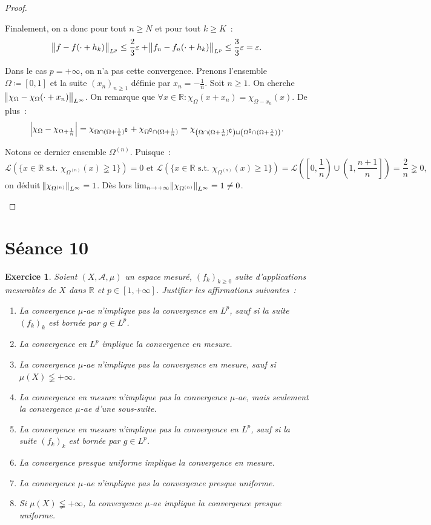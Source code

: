 \documentclass{article}
\newtheorem{ex}{Exercice}[section]
\theoremstyle{definition}
\newcommand{\pinfty}{{+\infty}}
\newcommand{\st}{\text{ s.t. }}
\newcommand{\C}{\complement}
\newcommand{\R}{{\mathbb R}}
\begin{document}
\begin{proof}
\begin{enumerate}
	Finalement, on a donc pour tout $n \geq N$ et pour tout $k \geq K$~:
	\[\norm {f-f(\cdot+h_k)}_{L^p} \leq \frac 23\varepsilon + \norm {f_n-f_n(\cdot+h_k)}_{L^p} \leq \frac 33\varepsilon = \varepsilon.\]

	Dans le cas $p = \pinfty$, on n'a pas cette convergence. Prenons l'ensemble $\Omega \coloneqq [0, 1]$ et la suite $(x_n)_{n \geq 1}$ définie par $x_n = -\frac 1n$.
	Soit $n \geq 1$. On cherche $\norm {\chi_\Omega-\chi_\Omega(\cdot + x_n)}_{L^\infty}$. On remarque que $\forall x \in \R : \chi_\Omega(x+x_n) = \chi_{\Omega-x_n}(x)$.
	De plus~:
	\[\abs {\chi_\Omega - \chi_{\Omega+\frac 1n}} = \chi_{\Omega \cap (\Omega + \frac 1n)^\C} + \chi_{\Omega^\C \cap (\Omega+\frac 1n)}
		= \chi_{\left(\Omega \cap (\Omega+\frac 1n)^\C\right) \sqcup \left(\Omega^\C \cap (\Omega+\frac 1n)\right)}.\]

	Notons ce dernier ensemble $\Omega^{(n)}$. Puisque~:
	\[\mathcal L(\{x \in \R \st \chi_{\Omega^{(n)}}(x) \gneqq 1\}) = 0 \text{ et } \mathcal L(\{x \in \R \st \chi_{\Omega^{(n)}}(x) \geq 1\})
		= \mathcal L\left(\left[0, \frac 1n\right) \cup \left(1, \frac {n+1}n\right]\right) = \frac 2n \gneqq 0,\]
	on déduit $\norm {\chi_{\Omega^{(n)}}}_{L^\infty} = 1$.
	Dès lors $\lim_{n \to \pinfty}\norm {\chi_{\Omega^{(n)}}}_{L^\infty} = 1 \neq 0$.
\end{enumerate}
\end{proof}

\newpage
\section{Séance 10}

\begin{ex} Soient $(X, \mathcal A, \mu)$ un espace mesuré, $(f_k)_{k \geq 0}$ suite d'applications mesurables de $X$ dans $\R$ et $p \in [1, \pinfty]$.
Justifier les affirmations suivantes~:
\begin{enumerate}
	\item La convergence $\mu$-ae n'implique pas la convergence en $L^p$, sauf si la suite $(f_k)_k$ est bornée par $g \in L^p$.
	\item La convergence en $L^p$ implique la convergence en mesure.
	\item La convergence $\mu$-ae n'implique pas la convergence en mesure, sauf si $\mu(X) \lneqq \pinfty$.
	\item La convergence en mesure n'implique pas la convergence $\mu$-ae, mais seulement la convergence $\mu$-ae d'une sous-suite.
	\item La convergence en mesure n'implique pas la convergence en $L^p$, sauf si la suite $(f_k)_k$ est bornée par $g \in L^p$.
	\item La convergence presque uniforme implique la convergence en mesure.
	\item La convergence $\mu$-ae n'implique pas la convergence presque uniforme.
	\item Si $\mu(X) \lneqq \pinfty$, la convergence $\mu$-ae implique la convergence presque uniforme.
\end{enumerate}
\end{ex}
\end{document}
